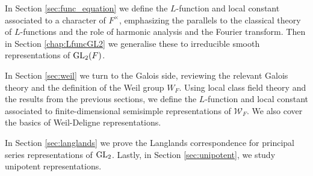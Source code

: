 In Section \ref{sec:func_equation} we define the $L$-function and local constant associated to a character of $F^\times$, emphasizing the parallels to the classical theory of $L$-functions and the role of harmonic analysis and the Fourier transform. Then in Section \ref{chap:LfuncGL2} we generalise these to irreducible smooth representations of $\mathrm{GL}_2(F)$.

In Section \ref{sec:weil} we turn to the Galois side, reviewing the relevant Galois theory and the definition of the Weil group $W_F$. Using local class field theory and the results from the previous sections, we define the $L$-function and local constant associated to finite-dimensional semisimple representations of $\mathcal{W}_F$. We also cover the basics of Weil-Deligne representations.

In Section \ref{sec:langlands} we prove the Langlands correspondence for principal series representations of $\mathrm{GL}_2$. Lastly, in Section \ref{sec:unipotent}, we study unipotent representations. 